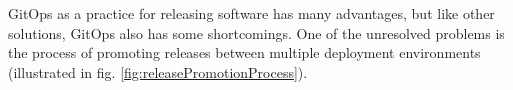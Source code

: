%
%
%






\noindent
GitOps as a practice for releasing software has many advantages,
but like other solutions, GitOps also has some shortcomings.
One of the unresolved problems is
the process of promoting releases between multiple deployment environments (illustrated in fig. \ref{fig:releasePromotionProcess}).


